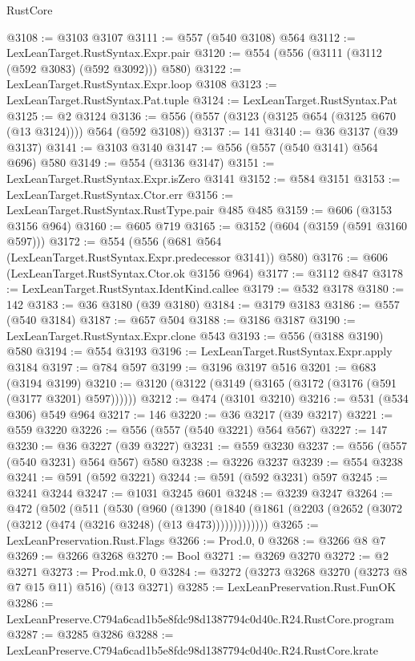 \begin{lexlean}{RustCore}
\begin{coremodule}
@3108 := @3103 @3107
@3111 := @557 (@540 @3108) @564
@3112 := LexLeanTarget.RustSyntax.Expr.pair
@3120 := @554 (@556 (@3111 (@3112 (@592 @3083) (@592 @3092))) @580)
@3122 := LexLeanTarget.RustSyntax.Expr.loop @3108
@3123 := LexLeanTarget.RustSyntax.Pat.tuple
@3124 := LexLeanTarget.RustSyntax.Pat
@3125 := @2 @3124
@3136 := @556 (@557 (@3123 (@3125 @654 (@3125 @670 (@13 @3124)))) @564 (@592 @3108))
@3137 := 141
@3140 := @36 @3137 (@39 @3137)
@3141 := @3103 @3140
@3147 := @556 (@557 (@540 @3141) @564 @696) @580
@3149 := @554 (@3136 @3147)
@3151 := LexLeanTarget.RustSyntax.Expr.isZero @3141
@3152 := @584 @3151
@3153 := LexLeanTarget.RustSyntax.Ctor.err
@3156 := LexLeanTarget.RustSyntax.RustType.pair @485 @485
@3159 := @606 (@3153 @3156 @964)
@3160 := @605 @719
@3165 := @3152 (@604 (@3159 (@591 @3160 @597)))
@3172 := @554 (@556 (@681 @564 (LexLeanTarget.RustSyntax.Expr.predecessor @3141)) @580)
@3176 := @606 (LexLeanTarget.RustSyntax.Ctor.ok @3156 @964)
@3177 := @3112 @847
@3178 := LexLeanTarget.RustSyntax.IdentKind.callee
@3179 := @532 @3178
@3180 := 142
@3183 := @36 @3180 (@39 @3180)
@3184 := @3179 @3183
@3186 := @557 (@540 @3184)
@3187 := @657 @504
@3188 := @3186 @3187
@3190 := LexLeanTarget.RustSyntax.Expr.clone @543
@3193 := @556 (@3188 @3190) @580
@3194 := @554 @3193
@3196 := LexLeanTarget.RustSyntax.Expr.apply @3184
@3197 := @784 @597
@3199 := @3196 @3197 @516
@3201 := @683 (@3194 @3199)
@3210 := @3120 (@3122 (@3149 (@3165 (@3172 (@3176 (@591 (@3177 @3201) @597))))))
@3212 := @474 (@3101 @3210)
@3216 := @531 (@534 @306) @549 @964
@3217 := 146
@3220 := @36 @3217 (@39 @3217)
@3221 := @559 @3220
@3226 := @556 (@557 (@540 @3221) @564 @567)
@3227 := 147
@3230 := @36 @3227 (@39 @3227)
@3231 := @559 @3230
@3237 := @556 (@557 (@540 @3231) @564 @567) @580
@3238 := @3226 @3237
@3239 := @554 @3238
@3241 := @591 (@592 @3221)
@3244 := @591 (@592 @3231) @597
@3245 := @3241 @3244
@3247 := @1031 @3245 @601
@3248 := @3239 @3247
@3264 := @472
    (@502
      (@511
        (@530
          (@960
            (@1390
              (@1840 (@1861 (@2203 (@2652 (@3072 (@3212 (@474 (@3216 @3248) (@13 @473)))))))))))))
@3265 := LexLeanPreservation.Rust.Flags
@3266 := Prod.{0, 0}
@3268 := @3266 @8 @7
@3269 := @3266 @3268
@3270 := Bool
@3271 := @3269 @3270
@3272 := @2 @3271
@3273 := Prod.mk.{0, 0}
@3284 := @3272 (@3273 @3268 @3270 (@3273 @8 @7 @15 @11) @516) (@13 @3271)
@3285 := LexLeanPreservation.Rust.FunOK
@3286 := LexLeanPreserve.C794a6cad1b5e8fdc98d1387794c0d40c.R24.RustCore.program
@3287 := @3285 @3286
@3288 := LexLeanPreserve.C794a6cad1b5e8fdc98d1387794c0d40c.R24.RustCore.krate

\end{coremodule}
\end{lexlean}
